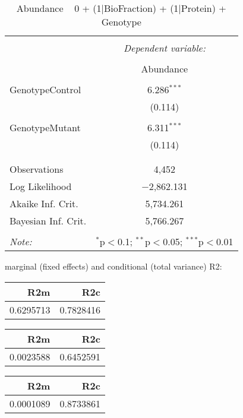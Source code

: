 \documentclass[11pt]{report}
\begin{document}
\begin{table}[!htbp] \centering 
  \caption{Abundance ~ 0 + (1|BioFraction) + (1|Protein) + Genotype} 
  \label{} 
\begin{tabular}{@{\extracolsep{5pt}}lc} 
\\[-1.8ex]\hline 
\hline \\[-1.8ex] 
 & \multicolumn{1}{c}{\textit{Dependent variable:}} \\ 
\cline{2-2} 
\\[-1.8ex] & Abundance \\ 
\hline \\[-1.8ex] 
 GenotypeControl & 6.286$^{***}$ \\ 
  & (0.114) \\ 
  & \\ 
 GenotypeMutant & 6.311$^{***}$ \\ 
  & (0.114) \\ 
  & \\ 
\hline \\[-1.8ex] 
Observations & 4,452 \\ 
Log Likelihood & $-$2,862.131 \\ 
Akaike Inf. Crit. & 5,734.261 \\ 
Bayesian Inf. Crit. & 5,766.267 \\ 
\hline 
\hline \\[-1.8ex] 
\textit{Note:}  & \multicolumn{1}{r}{$^{*}$p$<$0.1; $^{**}$p$<$0.05; $^{***}$p$<$0.01} \\ 
\end{tabular} 
\end{table} 
marginal (fixed effects) and conditional (total variance) R2:

\begin{tabular}{r|r}
\hline
R2m & R2c\\
\hline
0.6295713 & 0.7828416\\
\hline
\end{tabular}

\begin{tabular}{r|r}
\hline
R2m & R2c\\
\hline
0.0023588 & 0.6452591\\
\hline
\end{tabular}

\begin{tabular}{r|r}
\hline
R2m & R2c\\
\hline
0.0001089 & 0.8733861\\
\hline
\end{tabular}
\end{document}
